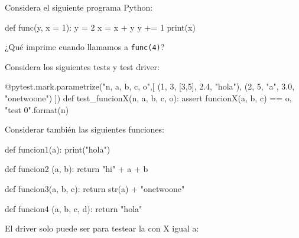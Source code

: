 \begin{ejercicio}  Considera el siguiente programa Python:

\begin{python}
def func(y, x = 1):
    y = 2
    x = x + y
    y += 1
    print(x)
\end{python}

¿Qué imprime cuando llamamos a \verb|func(4)|?

\begin{choices}
\end{choices}

\end{ejercicio}

\begin{ejercicio} Considera los siguientes tests y test driver:

\begin{small}
\begin{python}
@pytest.mark.parametrize("n, a, b, c, o",[
(1, 3, [3,5], 2.4, "hola"),
(2, 5, "a", 3.0, "onetwoone")
])
def test_funcionX(n, a, b, c, o):
    assert funcionX(a, b, c) == o,  "test {0}".format(n)
\end{python}
\end{small} 

Considerar también las siguientes funciones:

\begin{small}
\begin{python}
def funcion1(a):
    print("hola")

def funcion2 (a, b):
    return "hi" + a + b

def funcion3(a, b, c):
    return str(a) + "onetwoone"

def funcion4 (a, b, c, d):
    return "hola"
\end{python}
\end{small} 

El driver  solo puede ser para testear la  con X igual a:

\begin{choices}
\end{choices}
\end{ejercicio}




